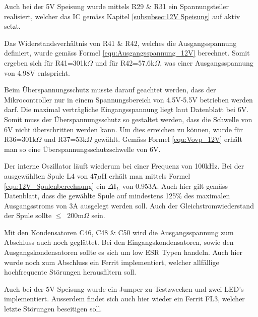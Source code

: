 Auch bei der 5V Speisung wurde mittels R29 \& R31 ein Spannungsteiler realisiert, welcher das IC gemäss Kapitel \ref{subsubsec:12V Speisung} auf aktiv setzt.

Das Widerstandsverhältnis von R41 \& R42, welches die Ausgangsspannung definiert, wurde gemäss Formel \ref{equ:Ausgangsspannung_12V} berechnet. Somit ergeben sich für R41=301k$\Omega$ und für R42=57.6k$\Omega$, was einer Ausgangsspannung von 4.98V entspricht. \cite[S.10]{monolithic_power_systems_mp24943_2011} 

Beim Überspannungsschutz musste darauf geachtet werden, dass der Mikrocontroller nur in einem Spannungsbereich von 4.5V-5.5V betrieben werden darf. Die maximal verträgliche Eingangsspannung liegt laut Datenblatt bei 6V. Somit muss der Überspannungsschutz so gestaltet werden, dass die Schwelle von 6V nicht überschritten werden kann. Um dies erreichen zu können, wurde für R36=301k$\Omega$ und R37=53k$\Omega$ gewählt. Gemäss Formel \ref{equ:Vovp_12V} erhält man so eine Überspannungsschutzschwelle von 6V. \cite[S.1]{atmel_atmel_2014} \cite[S.10]{monolithic_power_systems_mp24943_2011}

Der interne Oszillator läuft wiederum bei einer Frequenz von 100kHz. Bei der ausgewählten Spule L4 von 47$\mu$H erhält man mittels Formel \ref{equ:12V_Spulenberechnung} ein $\Delta$I$_{L}$ von 0.953A. Auch hier gilt gemäss Datenblatt, dass die gewählte Spule auf mindestens 125\% des maximalen Ausgangsstroms von 3A ausgelegt werden soll. Auch der Gleichstromwiederstand der Spule sollte $ \leq \ $ 200m$\Omega$  sein. \cite[S.3]{monolithic_power_systems_mp24943_2011} \cite[S.10]{monolithic_power_systems_mp24943_2011} 

Mit den Kondensatoren C46, C48 \& C50 wird die Ausgangsspannung zum Abschluss auch noch geglättet. Bei den Eingangskondensatoren, sowie den Ausgangskondensatoren sollte es sich um low ESR Typen handeln. Auch hier wurde noch zum Abschluss ein Ferrit implementiert, welcher allfällige hochfrequente Störungen herausfiltern soll.

Auch bei der 5V Speisung wurde ein Jumper zu Testzwecken und zwei LED's implementiert. Ausserdem findet sich auch hier wieder ein Ferrit FL3, welcher letzte Störungen beseitigen soll. 



